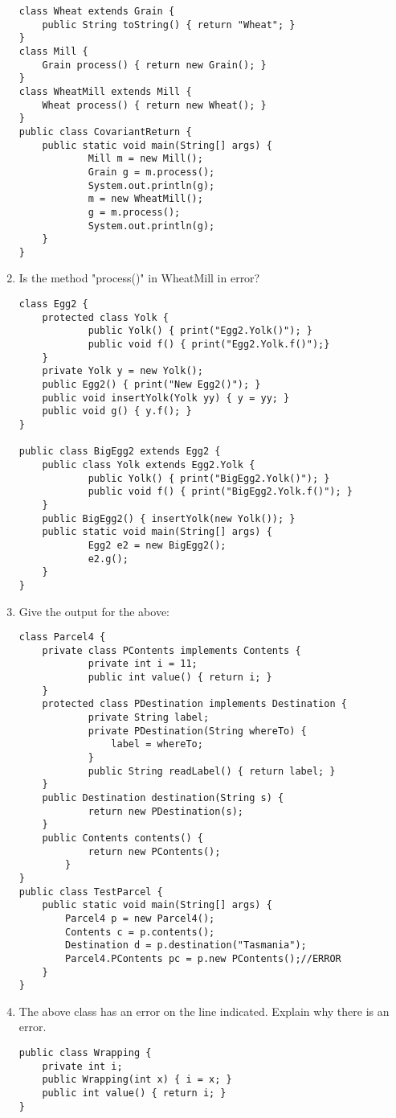 \documentclass{article}
\begin{document}
\begin{enumerate}
\begin{lstlisting}
class Wheat extends Grain {
  	public String toString() { return "Wheat"; }
}
class Mill {
  	Grain process() { return new Grain(); }
}
class WheatMill extends Mill {
  	Wheat process() { return new Wheat(); }
}
public class CovariantReturn {
  	public static void main(String[] args) {
    		Mill m = new Mill();
    		Grain g = m.process();
    		System.out.println(g);
    		m = new WheatMill();
    		g = m.process();
    		System.out.println(g);
  	}
}
\end{lstlisting}
	\item Is the method "process()" in WheatMill in error?
	\newpage
\begin{lstlisting}
class Egg2 {
  	protected class Yolk {   
    		public Yolk() { print("Egg2.Yolk()"); }       
    		public void f() { print("Egg2.Yolk.f()");}
  	}
  	private Yolk y = new Yolk();
  	public Egg2() { print("New Egg2()"); }
  	public void insertYolk(Yolk yy) { y = yy; }
  	public void g() { y.f(); }
} 

public class BigEgg2 extends Egg2 {
  	public class Yolk extends Egg2.Yolk {
    		public Yolk() { print("BigEgg2.Yolk()"); }
    		public void f() { print("BigEgg2.Yolk.f()"); }
  	}
  	public BigEgg2() { insertYolk(new Yolk()); }
  	public static void main(String[] args) {
    		Egg2 e2 = new BigEgg2();
    		e2.g();
  	}
}
\end{lstlisting}
	\item Give the output for the above:
	\newpage
	
\begin{lstlisting}
class Parcel4 {
  	private class PContents implements Contents {
    		private int i = 11;
    		public int value() { return i; }
  	}
  	protected class PDestination implements Destination {
    		private String label;
    		private PDestination(String whereTo) {
      			label = whereTo;
    		}
    		public String readLabel() { return label; }
  	}
  	public Destination destination(String s) {
    		return new PDestination(s);
  	}
  	public Contents contents() {
    		return new PContents();
    	}
}
public class TestParcel {
	public static void main(String[] args) {
		Parcel4 p = new Parcel4();
		Contents c = p.contents();
		Destination d = p.destination("Tasmania");
		Parcel4.PContents pc = p.new PContents();//ERROR
  	}
}
\end{lstlisting}
	\item The above class has an error on the line indicated. Explain why there is an error.\newpage
	
\begin{lstlisting}
public class Wrapping {
  	private int i;
  	public Wrapping(int x) { i = x; }
  	public int value() { return i; }
}


\end{lstlisting}
\end{enumerate}
\end{document}
